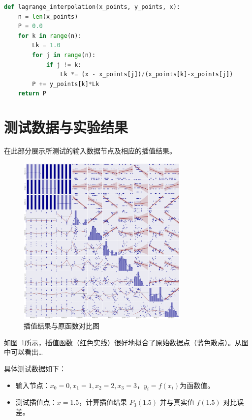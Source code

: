 \documentclass{joulabreport}
\begin{document}
{\begin{lstlisting}[language=Python, caption=Lagrange插值算法实现]
def lagrange_interpolation(x_points, y_points, x):
    n = len(x_points)
    P = 0.0
    for k in range(n):
        Lk = 1.0
        for j in range(n):
            if j != k:
                Lk *= (x - x_points[j])/(x_points[k]-x_points[j])
        P += y_points[k]*Lk
    return P
\end{lstlisting}

\section{测试数据与实验结果}
在此部分展示所测试的输入数据节点及相应的插值结果。

\begin{figure}[htbp]
    \centering
    \includegraphics[width=0.75\textwidth]{figure/regression_analysis.pdf}
    \caption{插值结果与原函数对比图}
    \label{fig:regression}
\end{figure}

如图~\ref{fig:regression}所示，插值函数（红色实线）很好地拟合了原始数据点（蓝色散点）。从图中可以看出\dots

具体测试数据如下：
\begin{itemize}
\item 输入节点：$x_0=0, x_1=1, x_2=2, x_3=3$，$y_i=f(x_i)$为函数值。
\item 测试插值点：$x=1.5$，计算插值结果 $P_3(1.5)$ 并与真实值 $f(1.5)$ 对比误差。
\end{itemize}

}
\end{document}
